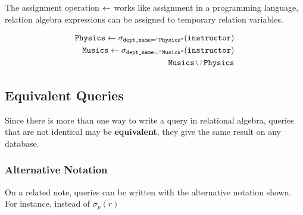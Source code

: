 \documentclass[11pt,a4paper,twocolumn]{book}
\begin{document}
The assignment operation $\leftarrow$ works like assignment in a programming language, relation algebra expressions can be assigned to temporary relation variables.

\begin{align*}
\texttt{Physics} \leftarrow \sigma_{\texttt{dept\_name} = \texttt{"Physics"}}(\texttt{instructor})\\
\texttt{Musics} \leftarrow \sigma_{\texttt{dept\_name} = \texttt{"Musics"}}(\texttt{instructor})\\
\texttt{Musics} \cup \texttt{Physics}
\end{align*}

\subsection{Equivalent Queries}

Since there is more than one way to write a query in relational algebra, queries that are not identical may be \textbf{equivalent}, they give the same result on any database.

\subsubsection{Alternative Notation}

On a related note, queries can be written with the alternative notation shown. For instance,  instead of $\sigma_p (r)$
\end{document}
